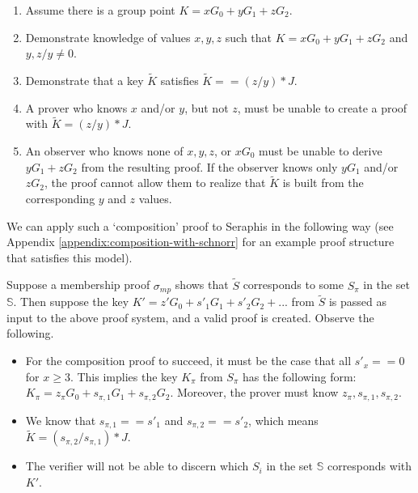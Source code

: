 \begin{enumerate}
    \item Assume there is a group point $K = x G_0 + y G_1 + z G_2$.

    \item Demonstrate knowledge of values $x, y, z$ such that $K = x G_0 + y G_1 + z G_2$ and $y, z/y \neq 0$.

    \item Demonstrate that a key $\tilde{K}$ satisfies $\tilde{K} == (z/y)*J$.

    \item A prover who knows $x$ and/or $y$, but not $z$, must be unable to create a proof with $\tilde{K} = (z/y)*J$.

    \item An observer who knows none of $x, y, z$, or $x G_0$ must be unable to derive $y G_1 + z G_2$ from the resulting proof. If the observer knows only $y G_1$ and/or $z G_2$, the proof cannot allow them to realize that $\tilde{K}$ is built from the corresponding $y$ and $z$ values.
\end{enumerate}

We can apply such a `composition' proof to Seraphis in the following way (see Appendix \ref{appendix:composition-with-schnorr} for an example proof structure that satisfies this model).

Suppose a membership proof $\sigma_{mp}$ shows that $\tilde{S}$ corresponds to some $S_{\pi}$ in the set $\mathbb{S}$. Then suppose the key $K' = z' G_0 + s'_1 G_1 + s'_2 G_2 + ...$ from $\tilde{S}$ is passed as input to the above proof system, and a valid proof is created. Observe the following.

\begin{itemize}
    \item For the composition proof to succeed, it must be the case that all $s'_x == 0$ for $x \geq 3$. This implies the key $K_{\pi}$ from $S_{\pi}$ has the following form: $K_{\pi} = z_{\pi} G_0 + s_{\pi, 1} G_1 + s_{\pi, 2} G_2$. Moreover, the prover must know $z_{\pi}, s_{\pi, 1}, s_{\pi, 2}$.

    \item We know that $s_{\pi, 1} == s'_1$ and $s_{\pi, 2} == s'_2$, which means $\tilde{K} = (s_{\pi, 2}/ s_{\pi, 1})*J$.

    \item The verifier will not be able to discern which $S_i$ in the set $\mathbb{S}$ corresponds with $K'$.
\end{itemize}

